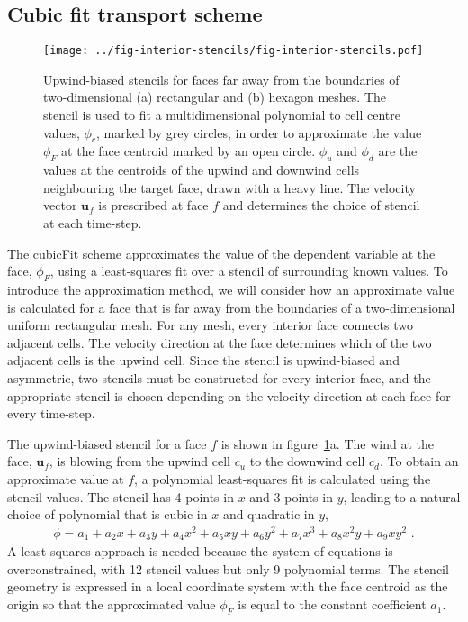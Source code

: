\subsection{Cubic fit transport scheme}

\begin{figure}
	\centering
	\texttt{[image: ../fig-interior-stencils/fig-interior-stencils.pdf]}
	\caption{Upwind-biased stencils for faces far away from the boundaries of two-dimensional (a) rectangular and (b) hexagon meshes.  The stencil is used to fit a multidimensional polynomial to cell centre values, $\phi_c$, marked by grey circles, in order to approximate the value $\phi_F$ at the face centroid marked by an open circle.  $\phi_u$ and $\phi_d$ are the values at the centroids of the upwind and downwind cells neighbouring the target face, drawn with a heavy line.  The velocity vector $\mathbf{u}_f$ is prescribed at face $f$ and determines the choice of stencil at each time-step.}
	\label{fig:interiorStencils}
\end{figure}

The cubicFit scheme approximates the value of the dependent variable at the face, $\phi_F$, using a least-squares fit over a stencil of surrounding known values.
To introduce the approximation method, we will consider how an approximate value is calculated for a face that is far away from the boundaries of a two-dimensional uniform rectangular mesh.
For any mesh, every interior face connects two adjacent cells.  The velocity direction at the face determines which of the two adjacent cells is the upwind cell.  Since the stencil is upwind-biased and asymmetric, two stencils must be constructed for every interior face, and the appropriate stencil is chosen depending on the velocity direction at each face for every time-step.

The upwind-biased stencil for a face $f$ is shown in figure~\ref{fig:interiorStencils}a.  The wind at the face, $\mathbf{u}_f$, is blowing from the upwind cell $c_u$ to the downwind cell $c_d$.
To obtain an approximate value at $f$, a polynomial least-squares fit is calculated using the stencil values.
The stencil has \num{4} points in $x$ and \num{3} points in $y$, leading to a natural choice of polynomial that is cubic in $x$ and quadratic in $y$,
\begin{align}
	\phi = a_1 + a_2 x + a_3 y + a_4 x^2 + a_5 xy + a_6 y^2 + a_7 x^3 + a_8 x^2 y + a_9 x y^2 \label{eqn:fullPoly} \text{ .}
\end{align}
A least-squares approach is needed because the system of equations is overconstrained, with \num{12} stencil values but only \num{9} polynomial terms.  The stencil geometry is expressed in a local coordinate system with the face centroid as the origin so that the approximated value $\phi_F$ is equal to the constant coefficient $a_1$.

